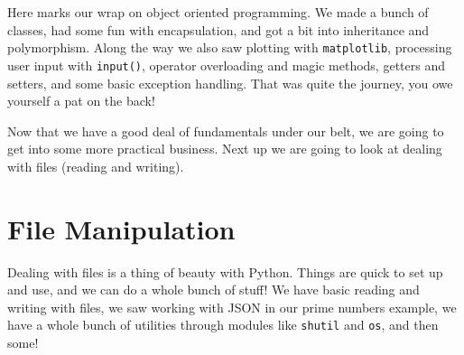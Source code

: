 \documentclass[12pt, twoside, reqno]{book}
\begin{document}
Here marks our wrap on object oriented programming. We made a bunch of classes, had some fun with encapsulation, and got a bit into inheritance and polymorphism. Along the way we also saw plotting with \texttt{matplotlib}, processing user input with \texttt{input()}, operator overloading and magic methods, getters and setters, and some basic exception handling. That was quite the journey, you owe yourself a pat on the back!

Now that we have a good deal of fundamentals under our belt, we are going to get into some more practical business. Next up we are going to look at dealing with files (reading and writing).

\section{File Manipulation}

Dealing with files is a thing of beauty with Python. Things are quick to set up and use, and we can do a whole bunch of stuff! We have basic reading and writing with files, we saw working with JSON in our prime numbers example, we have a whole bunch of utilities through modules like \texttt{shutil} and \texttt{os}, and then some!
\end{document}
